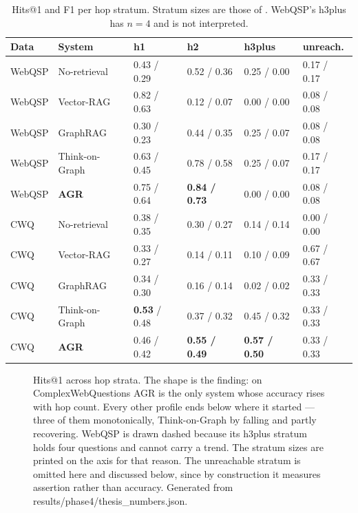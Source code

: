 \begin{table}[!tb]
  \begin{center}
    \caption[Hits@1 and F1 per hop stratum]{Hits@1 and F1 per hop stratum.
    Stratum sizes are those of . WebQSP's \textsf{h3plus} has
    $n = 4$ and is not interpreted.}
    \label{tab:strata}
    \small
    \begin{tabular}{|l|l|l|l|l|l|}
      \hline
      \textbf{Data} & \textbf{System} & \textbf{h1} & \textbf{h2} &
      \textbf{h3plus} & \textbf{unreach.} \\
      \hline
      WebQSP & No-retrieval   & 0.43 / 0.29 & 0.52 / 0.36 & 0.25 / 0.00 &
        0.17 / 0.17 \\
      WebQSP & Vector-RAG     & 0.82 / 0.63 & 0.12 / 0.07 & 0.00 / 0.00 &
        0.08 / 0.08 \\
      WebQSP & GraphRAG       & 0.30 / 0.23 & 0.44 / 0.35 & 0.25 / 0.07 &
        0.08 / 0.08 \\
      WebQSP & Think-on-Graph & 0.63 / 0.45 & 0.78 / 0.58 & 0.25 / 0.07 &
        0.17 / 0.17 \\
      WebQSP & \textbf{AGR}   & 0.75 / 0.64 & \textbf{0.84 / 0.73} &
        0.00 / 0.00 & 0.08 / 0.08 \\
      \hline
      CWQ & No-retrieval   & 0.38 / 0.35 & 0.30 / 0.27 & 0.14 / 0.14 &
        0.00 / 0.00 \\
      CWQ & Vector-RAG     & 0.33 / 0.27 & 0.14 / 0.11 & 0.10 / 0.09 &
        0.67 / 0.67 \\
      CWQ & GraphRAG       & 0.34 / 0.30 & 0.16 / 0.14 & 0.02 / 0.02 &
        0.33 / 0.33 \\
      CWQ & Think-on-Graph & \textbf{0.53} / 0.48 & 0.37 / 0.32 & 0.45 / 0.32 &
        0.33 / 0.33 \\
      CWQ & \textbf{AGR}   & 0.46 / 0.42 & \textbf{0.55 / 0.49} &
        \textbf{0.57 / 0.50} & 0.33 / 0.33 \\
      \hline
    \end{tabular}
  \end{center}
\end{table}

\begin{figure}[!tb]
  \begin{center}
    
  \end{center}
  \caption[Hits@1 across hop strata]{Hits@1 across hop strata. The shape is the
  finding: on ComplexWebQuestions AGR is the only system whose accuracy rises
  with hop count. Every other profile ends below where it started --- three
  of them monotonically, Think-on-Graph by falling and partly recovering. WebQSP
  is drawn dashed because its \textsf{h3plus} stratum holds four questions and
  cannot carry a trend. The stratum sizes are printed on the axis for that
  reason. The \textsf{unreachable} stratum is omitted here and discussed below,
  since by construction it measures assertion rather than accuracy. Generated
  from \textsf{results/phase4/thesis\_numbers.json}.}
  \label{fig:hop-strata}
\end{figure}

